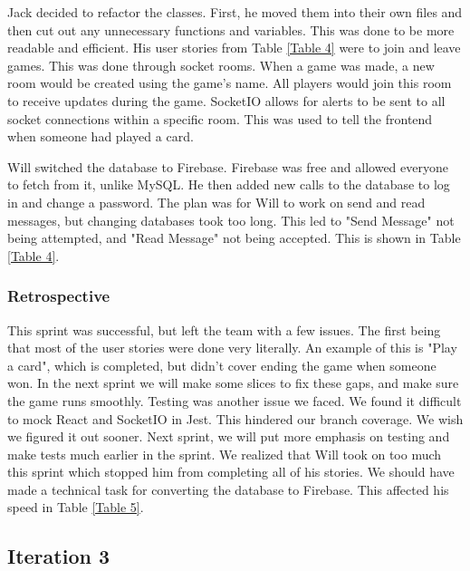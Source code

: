Jack decided to refactor the classes. First, he moved them into their own files and then cut out any unnecessary functions and variables. This was done to be more readable and efficient. His user stories from Table \ref{Table 4} were to join and leave games. This was done through socket rooms. When a game was made, a new room would be created using the game's name. All players would join this room to receive updates during the game. SocketIO allows for alerts to be sent to all socket connections within a specific room. This was used to tell the frontend when someone had played a card.

Will switched the database to Firebase. Firebase was free and allowed everyone to fetch from it, unlike MySQL. He then added new calls to the database to log in and change a password. The plan was for Will to work on send and read messages, but changing databases took too long. This led to "Send Message" not being attempted, and "Read Message" not being accepted. This is shown in Table \ref{Table 4}.

\subsubsection{Retrospective}
This sprint was successful, but left the team with a few issues. The first being that
most of the user stories were done very literally. An example of this is "Play a card", which is completed, but didn’t cover ending the game when someone won. In the next sprint we will make some slices to fix these gaps, and make sure the game runs smoothly. Testing was another issue we faced. We found it difficult to mock React and SocketIO in Jest. This hindered our branch coverage. We wish we figured it out sooner. Next sprint, we will put more emphasis on testing and make tests much earlier in the sprint. We realized that Will took on too much this sprint which stopped him from completing all of his stories. We should have made a technical task for converting the database to Firebase. This affected his speed in Table \ref{Table 5}.


\subsection{Iteration 3}

